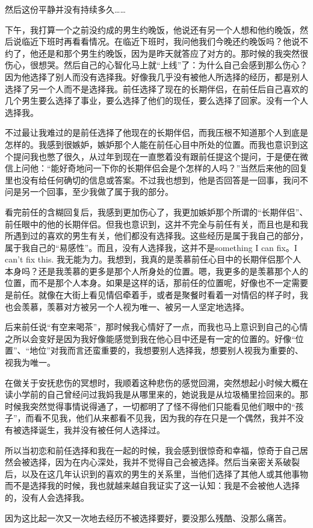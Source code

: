 然后这份平静并没有持续多久……

下午，我打算一个之前没约成的男生约晚饭，他说还有另一个人想和他约晚饭，然后说临近下班时再看看情况。在临近下班时，我问他我们今晚还约晚饭吗？他说不约了，他还是和那个男生约晚饭，因为是昨天就答应了对方的。那时候的我突然很伤心，很想哭。然后自己的心智化马上就“上线”了：为什么自己会感到那么伤心？因为他选择了别人而没有选择我。好像我几乎没有被他人所选择的经历，都是别人选择了另一个人而不是选择我。前任选择了现在的长期伴侣，在前任后自己喜欢的几个男生要么选择了事业，要么选择了他们的现任，要么选择了回家。没有一个人选择我。

不过最让我难过的是前任选择了他现在的长期伴侣，而我压根不知道那个人到底是怎样的。我感到很嫉妒，嫉妒那个人能在前任心目中所处的位置。而我也意识到这个提问我也憋了很久，从过年到现在一直憋着没有跟前任提这个提问，于是便在微信上问他：“能好奇地问一下你的长期伴侣会是个怎样的人吗？”当然后来他的回复里也没有给任何确切的信息或答案。不过我也想到，他是否回答是一回事，我问不问是另一个回事，至少我做了属于我的部分。

看完前任的含糊回复后，我感到更加伤心了，我更加嫉妒那个所谓的“长期伴侣”、前任眼中的他的长期伴侣。但我也意识到，这并不完全与前任有关，而且也是和我所遇到过的喜欢的男生有关，他们都没有选择我。这些经历是属于我自己的部分，属于我自己的“易感性”。而且，没有人选择我，这并不是something I can fix。I can't fix this. 我无能为力。我想到，我真的是羡慕前任心目中的长期伴侣那个人本身吗？还是我羡慕的更多是那个人所身处的位置。嗯，我更多的是羡慕那个人的位置，而不是那个人本身。如果是这样的话，那前任的位置呢，好像也不一定需要是前任。就像在大街上看见情侣牵着手，或者是聚餐时看着一对情侣的样子时，我也会羡慕，羡慕对方被另一个人视为唯一、被另一人坚定地选择。

后来前任说“有空来喝茶”，那时候我心情好了一点，而我也马上意识到自己的心情之所以会变好是因为我好像能感觉到我在他心目中还是有一定的位置的。好像“位置”、“地位”对我而言还蛮重要的，我想要别人选择我，想要别人视我为重要的、视我为唯一。

在做关于安抚悲伤的冥想时，我顺着这种悲伤的感觉回溯，突然想起小时候大概在读小学前的自己曾经问过我妈我是从哪里来的，她说我是从垃圾桶里捡回来的。那时候我突然觉得事情说得通了，一切都明了了\pozhehao{}怪不得他们只能看见他们眼中的“孩子”，而看不见我，他们从来都看不见我，因为我的存在只是一个偶然，我并不没有被选择诞生，我并没有被任何人选择过。

所以当初恋和前任选择和我在一起的时候，我会感到很惊奇和幸福，惊奇于自己居然会被选择，因为在内心深处，我并不觉得自己会被选择。然后当亲密关系破裂后，以及在这几年认识到的喜欢的男生的关系里，当他们选择了其他人或其他事物而不是选择我的时候，我也就越来越自我证实了这一认知：我是不会被他人选择的，没有人会选择我。

因为这比起一次又一次地去经历不被选择要好，要没那么残酷、没那么痛苦。

